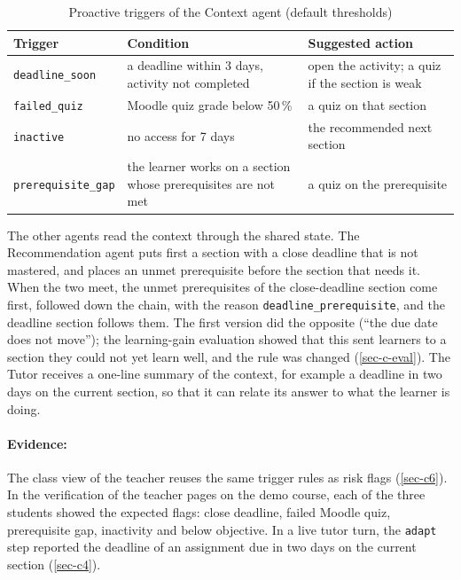 \begin{table}[htbp]
\centering
\caption{Proactive triggers of the Context agent (default thresholds)}
\label{tab-triggers}
\small
\begin{tabularx}{\textwidth}{@{}L{3.4cm}YY@{}}
\toprule
\textbf{Trigger} & \textbf{Condition} & \textbf{Suggested action} \\
\midrule
\texttt{deadline\_soon} & a deadline within 3 days, activity not completed & open the activity; a quiz if the section is weak \\
\texttt{failed\_quiz} & Moodle quiz grade below 50\,\% & a quiz on that section \\
\texttt{inactive} & no access for 7 days & the recommended next section \\
\texttt{prerequisite\_gap} & the learner works on a section whose prerequisites are not met & a quiz on the prerequisite \\
\bottomrule
\end{tabularx}
\end{table}

The other agents read the context through the shared state. The
Recommendation agent puts first a section with a close deadline that is
not mastered, and places an unmet prerequisite before the section that
needs it. When the two meet, the unmet prerequisites of the
close-deadline section come first, followed down the chain, with the
reason \texttt{deadline\_prerequisite}, and the deadline section follows
them. The first version did the opposite (``the due date does not
move''); the learning-gain evaluation showed that this sent learners to a
section they could not yet learn well, and the rule was changed
(\cref{sec-c-eval}). The Tutor receives a one-line summary of the
context, for example a deadline in two days on the current section, so
that it can relate its answer to what the learner is doing.

\paragraph{Evidence:} The class view of the teacher reuses the same
trigger rules as risk flags (\cref{sec-c6}). In the verification of the
teacher pages on the demo course, each of the three students showed the
expected flags: close deadline, failed Moodle quiz, prerequisite gap,
inactivity and below objective. In a live tutor turn, the \texttt{adapt}
step reported the deadline of an assignment due in two days on the
current section (\cref{sec-c4}).

